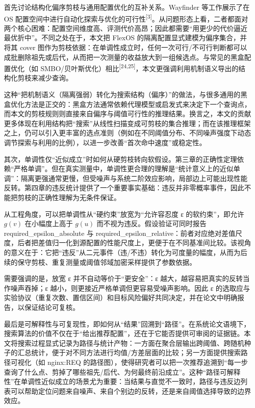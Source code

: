 \documentclass[UTF8,a4paper,12pt,twoside]{ctexart}  %
\begin{document}
首先讨论结构化偏序剪枝与通用配置优化的互补关系。Wayfinder 等工作展示了在 OS
配置空间中进行自动化探索与优化的可行性\textsuperscript{[3]}。从问题形态上看，二者都面对两个核心困难：配置空间维度高、评测代价高昂；因此都需要``用更少的代价逼近最优折中''。不同之处在于，本文把
FlexOS 的隔离配置显式建模为偏序集合，并将其 cover
图作为剪枝依据：在单调性成立时，任何一次可行/不可行判断都可以成批删除祖先或后代，从而把一次测量的收益放大到一组候选点。与常见的黑盒配置优化（如
SMBO/贝叶斯优化）相比\textsuperscript{[24,25]}，本文更强调利用机制语义导出的结构化剪枝来减少查询。

这种``把机制语义（隔离强弱）转化为搜索结构（偏序）''的做法，与很多通用的黑盒优化方法是正交的：黑盒方法通常依赖代理模型或启发式来决定下一个查询点，而本文的剪枝规则则直接来自偏序与阈值可行性的推理结果。换言之，本文的贡献更多体现在利用结构把``搜索''从线性扫描变成可剪枝的集合推理；而在该推理框架之上，仍可以引入更丰富的选点准则（例如在不同阈值分布、不同噪声强度下动态调节探索与利用的比例），以进一步改善``首次命中速度''或稳定性。

其次，单调性仅``近似成立''时如何从硬剪枝转向软假设。第三章的正确性定理依赖``严格单调''。但在真实测量中，单调性更合理的理解是``统计意义上的近似单调''：隔离更强通常更慢，但受噪声与系统二阶效应影响，局部边上可能出现性能反转。第四章的违反统计提供了一个重要事实基础：违反并非零概率事件，因此不能把剪枝的正确性理解为无条件保证。

从工程角度，可以把单调性从``硬约束''放宽为``允许容忍度 ε
的软约束''，即允许 \(g(v)\) 在小幅度上高于 \(g(u)\)
而不视为违反。假设验证可同时报告 required\_epsilon\_absolute 与
required\_epsilon\_relative：前者对应绝对差值尺度，后者把差值归一化到源配置的性能尺度上，更便于在不同基准间比较。该视角的意义在于：它把``违反''从二元事件（违/不违）转化为可度量的幅度，从而为后续的保守剪枝、重复测量或阈值邻域加密采样提供了参数依据。

需要强调的是，放宽 ε 并不自动等价于``更安全''：ε
越大，越容易把真实的反转当作噪声吞掉；ε
越小，则更接近严格单调但更容易受噪声影响。因此 ε
的选取应与实验协议（重复次数、置信区间）和目标风险偏好共同决定，并在论文中明确报告，以保证结论可复核。

最后是可解释性与可复现性，即如何从``结果''回溯到``路径''。在系统论文语境下，搜索算法的价值不仅在于``给出推荐配置''，还在于它能否提供可审阅的证据链。本文将搜索过程显式记录为路径与统计产物：一方面在聚合层输出跨阈值、跨随机种子的汇总统计，便于对不同方法进行均值/方差层面的比较；另一方面提供搜索路径可视化（如
nginx:REQ
的路径图），使得研究者可以把一次推荐追溯到``每一步查询了什么点、剪掉了哪些祖先/后代、为何最终前沿成立''。这种``路径可解释性''在单调性近似成立的场景尤为重要：当结果与直觉不一致时，路径与违反边列表可以帮助定位问题来自噪声、来自个别边的反转，还是来自阈值选择导致的边界效应。
\end{document}
